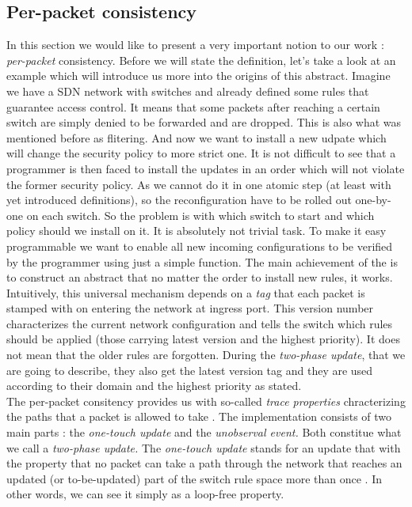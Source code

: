 \documentclass{article}
\begin{document}
\subsection{Per-packet consistency}
In this section we would like to present a very important notion to our work : \emph{per-packet} consistency. Before we will state the  definition, let's take a look at an example which will introduce us more into the origins of this abstract.
Imagine we have a SDN network with switches and already defined some rules that guarantee  access control. It means that some packets after reaching a certain switch are simply denied to be forwarded and are dropped. This is also what was mentioned before as flitering. And now we want to install a new udpate which will change  the security policy to more strict one. It is not difficult to see that a programmer is then faced to install the updates in an order which will not violate the former security policy. As we cannot do it in one atomic step (at least with yet introduced definitions), so the reconfiguration have to be rolled out one-by-one on each switch. So the problem is with which switch to start and which policy should we install on it. It is absolutely not trivial task.
To make it easy programmable we want to enable all new incoming configurations to be verified by the programmer using just a simple function. The main achievement of the \cite{Reitblatt:2012:ANU:2342356.2342427} is to construct an abstract that no matter the order to install new rules, it works. Intuitively, this universal mechanism depends on a \emph{tag} that each packet is stamped with on entering the network at ingress port. This version number characterizes the current network configuration and tells the switch which rules should be applied (those carrying latest version and the highest priority). It does not mean that the older rules are forgotten. During the \emph{two-phase update}, that we are going to describe, they also get the latest version tag and they are used according to their domain and the highest priority as stated.\\
The per-packet consitency provides us with so-called \emph{trace properties} chracterizing the paths that a packet is allowed to take \cite{Reitblatt:2012:ANU:2342356.2342427}. 
The implementation consists of two main parts : the \emph{one-touch update} and the \emph{unobserval event.} Both constitue what we call a \emph{two-phase update.} 
The \emph{one-touch update} stands for an update that with the property that no packet can take a path through the network that reaches an updated (or to-be-updated) part of the switch rule space more than once \cite{Reitblatt:2012:ANU:2342356.2342427}. In other words, we can see it simply as a loop-free property.
\end{document}
